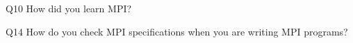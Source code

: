 \begin{description}%
\item{Q10} How did you learn MPI?%
\item{Q14} How do you check MPI specifications when you are writing MPI programs?%
\end{description}%
